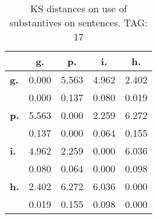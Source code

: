 \begin{table}[h!]
\begin{center}
\begin{tabular}{| l || c | c | c | c |}\hline
 & {\bf g.} & {\bf p.} & {\bf i.} & {\bf h.} \\\hline\hline
{\bf g.} & 0.000 & 5.563 & 4.962 & 2.402 \\
{\bf } & 0.000 & 0.137 & 0.080 & 0.019 \\\hline
{\bf p.} & 5.563 & 0.000 & 2.259 & 6.272 \\
{\bf } & 0.137 & 0.000 & 0.064 & 0.155 \\\hline
{\bf i.} & 4.962 & 2.259 & 0.000 & 6.036 \\
{\bf } & 0.080 & 0.064 & 0.000 & 0.098 \\\hline
{\bf h.} & 2.402 & 6.272 & 6.036 & 0.000 \\
{\bf } & 0.019 & 0.155 & 0.098 & 0.000 \\\hline
\end{tabular}
\caption{KS distances on use of substantives on sentences. TAG: 17}
\end{center}
\end{table}